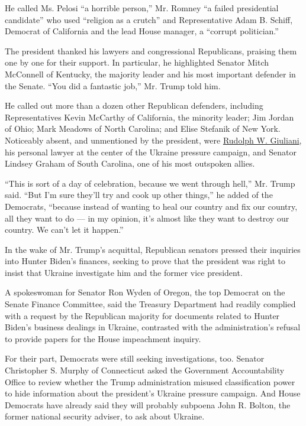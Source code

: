He called Ms. Pelosi ``a horrible person,'' Mr. Romney ``a failed
presidential candidate'' who used ``religion as a crutch'' and
Representative Adam B. Schiff, Democrat of California and the lead House
manager, a ``corrupt politician.''

The president thanked his lawyers and congressional Republicans,
praising them one by one for their support. In particular, he
highlighted Senator Mitch McConnell of Kentucky, the majority leader and
his most important defender in the Senate. ``You did a fantastic job,''
Mr. Trump told him.

He called out more than a dozen other Republican defenders, including
Representatives Kevin McCarthy of California, the minority leader; Jim
Jordan of Ohio; Mark Meadows of North Carolina; and Elise Stefanik of
New York. Noticeably absent, and unmentioned by the president, were
\href{https://www.nytimes.com/interactive/2020/01/15/magazine/rudy-giuliani.html}{Rudolph
W. Giuliani}, his personal lawyer at the center of the Ukraine pressure
campaign, and Senator Lindsey Graham of South Carolina, one of his most
outspoken allies.

``This is sort of a day of celebration, because we went through hell,''
Mr. Trump said. ``But I'm sure they'll try and cook up other things,''
he added of the Democrats, ``because instead of wanting to heal our
country and fix our country, all they want to do --- in my opinion, it's
almost like they want to destroy our country. We can't let it happen.''

In the wake of Mr. Trump's acquittal, Republican senators pressed their
inquiries into Hunter Biden's finances, seeking to prove that the
president was right to insist that Ukraine investigate him and the
former vice president.

A spokeswoman for Senator Ron Wyden of Oregon, the top Democrat on the
Senate Finance Committee, said the Treasury Department had readily
complied with a request by the Republican majority for documents related
to Hunter Biden's business dealings in Ukraine, contrasted with the
administration's refusal to provide papers for the House impeachment
inquiry.

For their part, Democrats were still seeking investigations, too.
Senator Christopher S. Murphy of Connecticut asked the Government
Accountability Office to review whether the Trump administration misused
classification power to hide information about the president's Ukraine
pressure campaign. And House Democrats have already said they will
probably subpoena John R. Bolton, the former national security adviser,
to ask about Ukraine.

